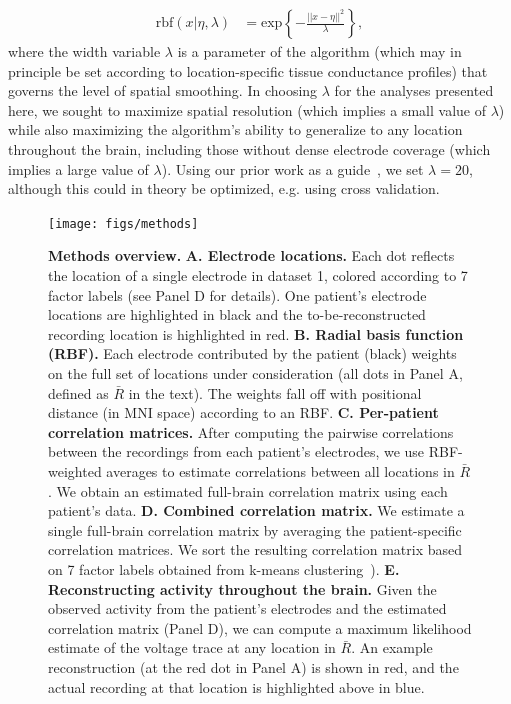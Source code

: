 \documentclass[11pt]{article}
\begin{document}
\begin{align}
  \mathrm{rbf}(x|\eta,\lambda) & =
  \mathrm{exp}\left\{ -\frac{||x - \eta||^2}{\lambda} \right\},\label{eqn:rbf}
\end{align}
where the width variable $\lambda$ is a parameter of the algorithm
(which may in principle be set according to location-specific tissue
conductance profiles) that governs the level of spatial smoothing.  In
choosing $\lambda$ for the analyses presented here, we sought to
maximize spatial resolution (which implies a small value of $\lambda$)
while also maximizing the algorithm's ability to generalize to any
location throughout the brain, including those without dense electrode
coverage (which implies a large value of $\lambda$). Using our prior
work as a guide~\cite{MannEtal14b}, we set $\lambda = 20$, although
this could in theory be optimized, e.g. using cross validation.


\begin{figure}
  \centering
  \texttt{[image: figs/methods]}
  \caption{\textbf{Methods overview.}  \textbf{A.  Electrode
      locations.}  Each dot reflects the location of a single
    electrode in dataset 1, colored according to 7 factor labels (see Panel D for details). One patient's electrode locations are
    highlighted in black and the to-be-reconstructed recording location
    is highlighted in red. \textbf{B. Radial basis function (RBF).}
    Each electrode contributed by the patient (black) weights on the
    full set of locations under consideration (all dots in Panel A,
    defined as $\bar{R}$ in the text).  The weights fall off with
    positional distance (in MNI space) according to an RBF.
    \textbf{C. Per-patient correlation matrices.}  After computing the
    pairwise correlations between the recordings from each patient's
    electrodes, we use RBF-weighted averages to estimate correlations
    between all locations in $\bar{R}$.  We obtain an estimated
    full-brain correlation matrix using each patient's
    data. \textbf{D.  Combined correlation matrix.}  We estimate a
    single full-brain correlation matrix by averaging 
    the patient-specific correlation matrices.  We sort the resulting correlation matrix based on 7 factor labels obtained from k-means clustering~\cite{YeoEtal11}). \textbf{E.
      Reconstructing activity throughout the brain.}  Given the observed
    activity from the patient's electrodes and the estimated
    correlation matrix (Panel D), we can compute a maximum likelihood
    estimate of the voltage trace at any location in $\bar{R}$.  An
    example reconstruction (at the red dot in Panel A) is shown in
    red, and the actual recording at that location is highlighted above in blue.}
  \label{fig:methods}
\end{figure}
\end{document}
